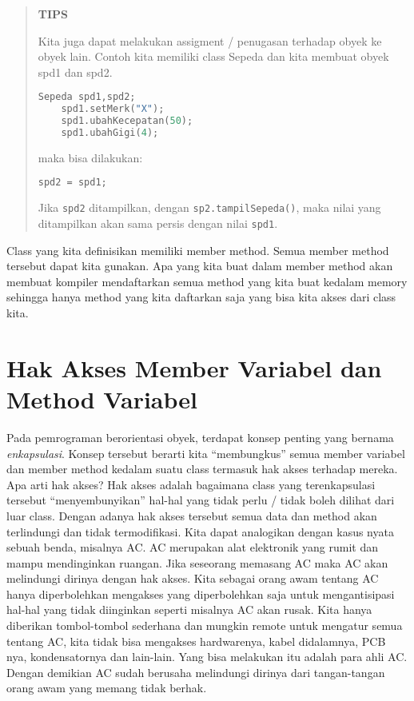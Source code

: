 \begin{quotation}
{\LARGE {}} 	\textbf{TIPS}
	
	Kita juga
	dapat melakukan assigment / penugasan terhadap obyek ke obyek lain.
	Contoh kita memiliki class Sepeda dan kita membuat obyek spd1 dan spd2.
	
	\begin{lstlisting}[language=c++, numbers=none]
	Sepeda spd1,spd2;
	spd1.setMerk("X");
	spd1.ubahKecepatan(50);
	spd1.ubahGigi(4);
	\end{lstlisting}
	
	maka bisa dilakukan:
	
	\begin{lstlisting}[language=c++, numbers=none]
	spd2 = spd1;
	\end{lstlisting}
	
	Jika \texttt{spd2} ditampilkan, dengan \texttt{sp2.tampilSepeda()}, maka
	nilai yang ditampilkan akan sama persis dengan nilai \texttt{spd1}.
\end{quotation}


Class yang kita definisikan memiliki member method. Semua member method
tersebut dapat kita gunakan. Apa yang kita buat dalam member method akan
membuat kompiler mendaftarkan semua method yang kita buat kedalam memory
sehingga hanya method yang kita daftarkan saja yang bisa kita akses dari
class kita.

\section{Hak Akses Member Variabel dan Method
Variabel}\label{hak-akses-member-variabel-dan-method-variabel}

Pada pemrograman berorientasi obyek, terdapat konsep penting yang
bernama \emph{enkapsulasi}. Konsep tersebut berarti kita ``membungkus''
semua member variabel dan member method kedalam suatu class termasuk hak
akses terhadap mereka. Apa arti hak akses? Hak akses adalah bagaimana
class yang terenkapsulasi tersebut ``menyembunyikan'' hal-hal yang tidak
perlu / tidak boleh dilihat dari luar class. Dengan adanya hak akses
tersebut semua data dan method akan terlindungi dan tidak termodifikasi.
Kita dapat analogikan dengan kasus nyata sebuah benda, misalnya AC. AC
merupakan alat elektronik yang rumit dan mampu mendinginkan ruangan.
Jika seseorang memasang AC maka AC akan melindungi dirinya dengan hak
akses. Kita sebagai orang awam tentang AC hanya diperbolehkan mengakses
yang diperbolehkan saja untuk mengantisipasi hal-hal yang tidak
diinginkan seperti misalnya AC akan rusak. Kita hanya diberikan
tombol-tombol sederhana dan mungkin remote untuk mengatur semua tentang
AC, kita tidak bisa mengakses hardwarenya, kabel didalamnya, PCB nya,
kondensatornya dan lain-lain. Yang bisa melakukan itu adalah para ahli
AC. Dengan demikian AC sudah berusaha melindungi dirinya dari
tangan-tangan orang awam yang memang tidak berhak.

